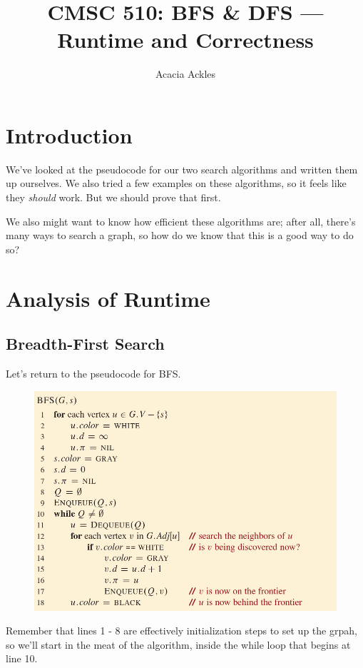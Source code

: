\documentclass[]{article}
\title{CMSC 510: BFS \& DFS --- Runtime and Correctness}
\author{Acacia Ackles}
\begin{document}
\maketitle

\section*{Introduction}

We've looked at the pseudocode for our two search algorithms and written them up ourselves. We also tried a few examples on these algorithms, so it feels like they \textit{should} work. But we should prove that first. 

We also might want to know how efficient these algorithms are; after all, there's many ways to search a graph, so how do we know that this is a good way to do so? 

\section*{Analysis of Runtime}

\subsection*{Breadth-First Search}

Let's return to the pseudocode for BFS.

\begin{figure}[h]
    \includegraphics[width=\textwidth]{bfs-pseudocode.png}
\end{figure}

Remember that lines 1 - 8 are effectively initialization steps to set up the grpah, so we'll start in the meat of the algorithm, inside the while loop that begins at line 10. 
\end{document}
